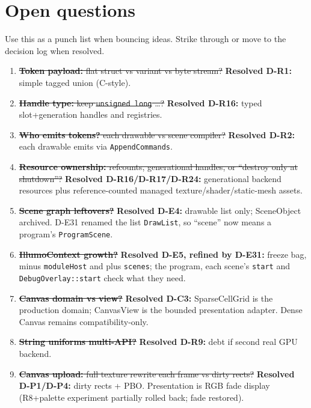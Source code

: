 \section{Open questions}
\label{sec:open}

Use this as a punch list when bouncing ideas. Strike through or move to the
decision log when resolved.

\begin{openbox}
\begin{enumerate}
  \item \sout{\textbf{Token payload:} flat struct vs variant vs byte stream?}
        \textbf{Resolved D-R1:} simple tagged union (C-style).
  \item \sout{\textbf{Handle type:} keep \texttt{unsigned long} \ldots?}
        \textbf{Resolved D-R16:} typed slot+generation handles and registries.
  \item \sout{\textbf{Who emits tokens?} each drawable vs scene compiler?}
        \textbf{Resolved D-R2:} each drawable emits via \texttt{AppendCommands}.
  \item \sout{\textbf{Resource ownership:} refcounts, generational handles, or
        ``destroy only at shutdown''?}
        \textbf{Resolved D-R16/D-R17/D-R24:} generational backend resources plus
        reference-counted managed texture/shader/static-mesh assets.
  \item \sout{\textbf{Scene graph leftovers?}}
        \textbf{Resolved D-E4:} drawable list only; SceneObject archived.
        D-E31 renamed the list \texttt{DrawList}, so ``scene'' now means a
        program's \texttt{ProgramScene}.
  \item \sout{\textbf{IllumoContext growth?}}
        \textbf{Resolved D-E5, refined by D-E31:} freeze bag, minus
        \texttt{moduleHost} and plus \texttt{scenes}; the program, each scene's
        \texttt{start} and \texttt{DebugOverlay::start} check what they need.
  \item \sout{\textbf{Canvas domain vs view?}}
        \textbf{Resolved D-C3:} SparseCellGrid is the production domain;
        CanvasView is the bounded presentation adapter. Dense Canvas remains
        compatibility-only.
  \item \sout{\textbf{String uniforms multi-API?}}
        \textbf{Resolved D-R9:} debt if second real GPU backend.
  \item \sout{\textbf{Canvas upload:} full texture rewrite each frame vs dirty rects?}
        \textbf{Resolved D-P1/D-P4:} dirty rects + PBO. Presentation is RGB
        fade display (R8+palette experiment partially rolled back; fade restored).

\end{enumerate}
\end{openbox}
